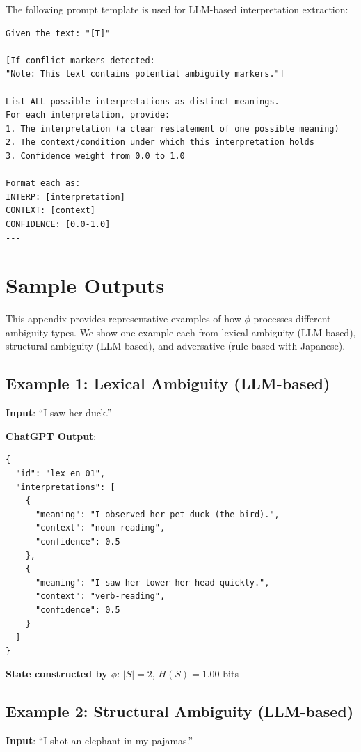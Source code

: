 \documentclass[11pt,a4paper]{article}
\begin{document}
The following prompt template is used for LLM-based interpretation extraction:

\begin{verbatim}
Given the text: "[T]"

[If conflict markers detected: 
"Note: This text contains potential ambiguity markers."]

List ALL possible interpretations as distinct meanings.
For each interpretation, provide:
1. The interpretation (a clear restatement of one possible meaning)
2. The context/condition under which this interpretation holds
3. Confidence weight from 0.0 to 1.0

Format each as:
INTERP: [interpretation]
CONTEXT: [context]
CONFIDENCE: [0.0-1.0]
---
\end{verbatim}

\section{Sample Outputs}
\label{app:samples}

This appendix provides representative examples of how $\phi$ processes different 
ambiguity types. We show one example each from lexical ambiguity (LLM-based), 
structural ambiguity (LLM-based), and adversative (rule-based with Japanese).

\subsection*{Example 1: Lexical Ambiguity (LLM-based)}

\textbf{Input}: ``I saw her duck.''

\textbf{ChatGPT Output}:
\begin{verbatim}
{
  "id": "lex_en_01",
  "interpretations": [
    {
      "meaning": "I observed her pet duck (the bird).",
      "context": "noun-reading",
      "confidence": 0.5
    },
    {
      "meaning": "I saw her lower her head quickly.",
      "context": "verb-reading",
      "confidence": 0.5
    }
  ]
}
\end{verbatim}

\textbf{State constructed by $\phi$}: $|S| = 2$, $H(S) = 1.00$ bits

\subsection*{Example 2: Structural Ambiguity (LLM-based)}

\textbf{Input}: ``I shot an elephant in my pajamas.''
\end{document}
